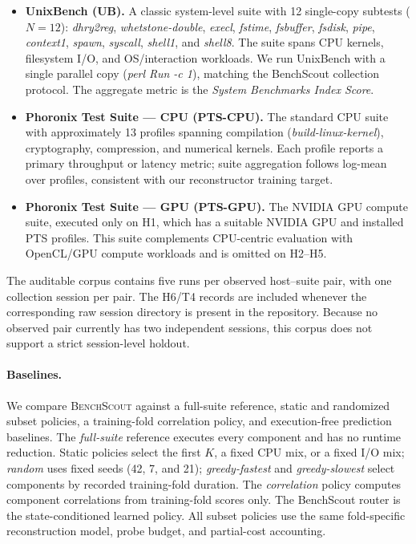 \documentclass[sigplan,10pt]{acmart}
\newcommand{\ourmethod}{\textsc{BenchScout}\xspace}
\newcommand{\ptscpu}{PTS-CPU}
\newcommand{\ptsgpu}{PTS-GPU}
\newcommand{\id}[1]{{\itshape #1}}
\newcommand{\appname}{BenchScout}
\begin{document}
\begin{itemize}
    \item \textbf{UnixBench (UB).} A classic system-level suite with 12 single-copy subtests (\(N=12\)): \id{dhry2reg}, \id{whetstone-double}, \id{execl}, \id{fstime}, \id{fsbuffer}, \id{fsdisk}, \id{pipe}, \id{context1}, \id{spawn}, \id{syscall}, \id{shell1}, and \id{shell8}.
    The suite spans CPU kernels, filesystem I/O, and OS/interaction workloads.
    We run UnixBench with a single parallel copy (\id{perl Run -c 1}), matching the \appname{} collection protocol.
    The aggregate metric is the \emph{System Benchmarks Index Score}.

    \item \textbf{Phoronix Test Suite --- CPU (\ptscpu).} The standard CPU suite with approximately 13 profiles spanning compilation (\id{build-linux-kernel}), cryptography, compression, and numerical kernels.
    Each profile reports a primary throughput or latency metric; suite aggregation follows log-mean over profiles, consistent with our reconstructor training target.

    \item \textbf{Phoronix Test Suite --- GPU (\ptsgpu).} The NVIDIA GPU compute suite, executed only on H1, which has a suitable NVIDIA GPU and installed PTS profiles.
    This suite complements CPU-centric evaluation with OpenCL/GPU compute workloads and is omitted on H2--H5.
\end{itemize}

The auditable corpus contains five runs per observed host--suite pair, with one collection session per pair.  The H6/T4 records are included whenever the corresponding raw session directory is present in the repository.  Because no observed pair currently has two independent sessions, this corpus does not support a strict session-level holdout.

\paragraph{Baselines.}
We compare \ourmethod against a full-suite reference, static and randomized subset policies, a training-fold correlation policy, and execution-free prediction baselines.  The \emph{full-suite} reference executes every component and has no runtime reduction.  Static policies select the first \(K\), a fixed CPU mix, or a fixed I/O mix; \emph{random} uses fixed seeds (42, 7, and 21); \emph{greedy-fastest} and \emph{greedy-slowest} select components by recorded training-fold duration.  The \emph{correlation} policy computes component correlations from training-fold scores only.  The BenchScout router is the state-conditioned learned policy.  All subset policies use the same fold-specific reconstruction model, probe budget, and partial-cost accounting.
\end{document}
